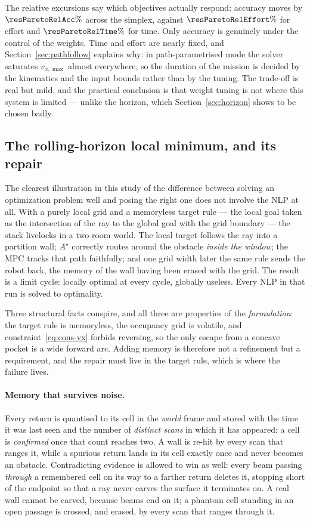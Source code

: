 \documentclass[11pt,a4paper]{article}
\newcommand{\astar}{$A^\star$}
\begin{document}
The relative excursions say which objectives actually respond: accuracy moves by $\resParetoRelAcc\%$ across
the simplex, against $\resParetoRelEffort\%$ for effort and $\resParetoRelTime\%$ for time. Only accuracy is
genuinely under the control of the weights. Time and effort are nearly fixed, and Section~\ref{sec:pathfollow}
explains why: in path-parametrised mode the solver saturates $v_{x,\max}$ almost everywhere, so the duration
of the mission is decided by the kinematics and the input bounds rather than by the tuning. The trade-off is
real but mild, and the practical conclusion is that weight tuning is not where this system is limited ---
unlike the horizon, which Section~\ref{sec:horizon} shows to be chosen badly.

\subsection{The rolling-horizon local minimum, and its repair}
\label{sec:localmin}

The clearest illustration in this study of the difference between solving an optimization problem well and
posing the right one does not involve the NLP at all. With a purely local grid and a memoryless target rule
--- the local goal taken as the intersection of the ray to the global goal with the grid boundary --- the
stack livelocks in a two-room world. The local target follows the ray into a partition wall; \astar{}
correctly routes around the obstacle \emph{inside the window}; the MPC tracks that path faithfully; and one
grid width later the same rule sends the robot back, the memory of the wall having been erased with the grid.
The result is a limit cycle: locally optimal at every cycle, globally useless. Every NLP in that run is
solved to optimality.

Three structural facts conspire, and all three are properties of the \emph{formulation}: the target rule is
memoryless, the occupancy grid is volatile, and constraint~\eqref{eq:cons-vx} forbids reversing, so the only
escape from a concave pocket is a wide forward arc. Adding memory is therefore not a refinement but a
requirement, and the repair must live in the target rule, which is where the failure lives.

\paragraph{Memory that survives noise.} Every return is quantised to its cell in the \emph{world} frame and
stored with the time it was last seen and the number of \emph{distinct scans} in which it has appeared; a
cell is \emph{confirmed} once that count reaches two. A wall is re-hit by every scan that ranges it, while a
spurious return lands in its cell exactly once and never becomes an obstacle. Contradicting evidence is
allowed to win as well: every beam passing \emph{through} a remembered cell on its way to a farther return
deletes it, stopping short of the endpoint so that a ray never carves the surface it terminates on. A real
wall cannot be carved, because beams end on it; a phantom cell standing in an open passage is crossed, and
erased, by every scan that ranges through it.
\end{document}
